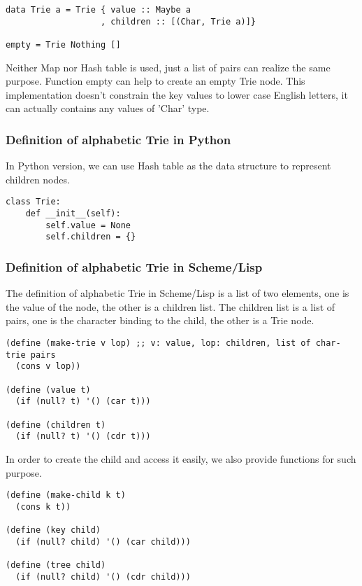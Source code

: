 \documentclass{article}
\begin{document}
\lstset{language=Haskell}
\begin{lstlisting}
data Trie a = Trie { value :: Maybe a
                   , children :: [(Char, Trie a)]}

empty = Trie Nothing []
\end{lstlisting}

Neither Map nor Hash table is used, just a list of pairs can realize
the same purpose. Function empty can help to create an empty Trie
node. This implementation doesn't constrain the key values to lower
case English letters, it can actually contains any values of 'Char' type.

\subsubsection*{Definition of alphabetic Trie in Python}
In Python version, we can use Hash table as the data structure to
represent children nodes.

\lstset{language=Python}
\begin{lstlisting}
class Trie:
    def __init__(self):
        self.value = None
        self.children = {}
\end{lstlisting}

\subsubsection*{Definition of alphabetic Trie in Scheme/Lisp}

The definition of alphabetic Trie in Scheme/Lisp is a list of two
elements, one is the value of the node, the other is a children
list. The children list is a list of pairs, one is the character
binding to the child, the other is a Trie node.

\lstset{language=lisp}
\begin{lstlisting}
(define (make-trie v lop) ;; v: value, lop: children, list of char-trie pairs
  (cons v lop))

(define (value t)
  (if (null? t) '() (car t)))

(define (children t)
  (if (null? t) '() (cdr t)))
\end{lstlisting}

In order to create the child and access it easily, we also provide
functions for such purpose.

\begin{lstlisting}
(define (make-child k t)
  (cons k t))

(define (key child)
  (if (null? child) '() (car child)))

(define (tree child)
  (if (null? child) '() (cdr child)))
\end{lstlisting}
\end{document}
